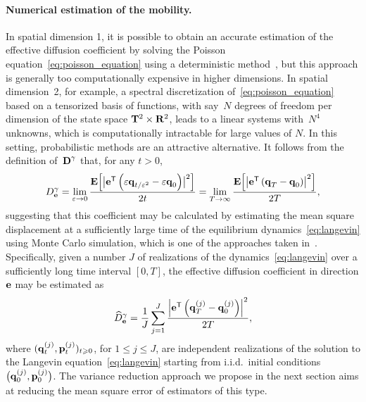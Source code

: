 \documentclass[11pt,a4paper]{article}
\begin{document}
\paragraph{Numerical estimation of the mobility.}
In spatial dimension 1,
it is possible to obtain an accurate estimation of the effective diffusion coefficient by solving the Poisson equation~\eqref{eq:poisson_equation} using a deterministic method~\cite{roussel2018spectral},
but this approach is generally too computationally expensive in higher dimensions.
In spatial dimension~2, for example,
a spectral discretization of~\eqref{eq:poisson_equation} based on a tensorized basis of functions,
with say~$N$ degrees of freedom per dimension of the state space $\mathbf T^2 \times \mathbf R^2$, leads to a linear systems with~$N^4$ unknowns,
which is computationally intractable for large values of $N$.
In this setting, probabilistic methods are an attractive alternative.
It follows from the definition of~$\boldsymbol{\mathbf D}^{\gamma}$ that,
for any $t > 0$,%
\begin{equation}
    \label{eq:einsteins_formula}
    D^{\gamma}_{\boldsymbol{\mathbf e}}
    =\lim_{\varepsilon \to 0} \frac{\mathbf{E}\Bigl[\bigl\lvert \boldsymbol{\mathbf e}^\mathsf T \left(\varepsilon \boldsymbol{\mathbf q}_{t/\varepsilon^2} - \varepsilon \boldsymbol{\mathbf q}_0\right) \bigr\rvert^2\Bigr]}{2 t}
    =\lim_{T \to \infty} \frac{\mathbf{E} \Bigl[\bigl\lvert \boldsymbol{\mathbf e}^\mathsf T \left(\boldsymbol{\mathbf q}_T - \boldsymbol{\mathbf q}_0\right) \bigr\rvert^2\Bigr]}{2T},
\end{equation}
suggesting that this coefficient may be calculated by
estimating the mean square displacement at a sufficiently large time of the equilibrium dynamics~\eqref{eq:langevin}
using Monte Carlo simulation,
which is one of the approaches taken in~\cite{MR2427108}.
Specifically, given a number $J$ of realizations of the dynamics~\eqref{eq:langevin} over a sufficiently long time interval $[0, T]$,
the effective diffusion coefficient in direction $\boldsymbol{\mathbf e}$ may be estimated as
\begin{equation}
    \label{eq:naive_estimator}
    \widehat D^{\gamma}_{\boldsymbol{\mathbf e}}
    = \frac{1}{J} \sum_{j=1}^{J} \frac{\left\lvert \boldsymbol{\mathbf e}^\mathsf T \left(\boldsymbol{\mathbf q}^{(j)}_T - \boldsymbol{\mathbf q}^{(j)}_0\right) \right\rvert^2}{2T},
\end{equation}
where $(\boldsymbol{\mathbf q}_t^{(j)}, \boldsymbol{\mathbf p}_t^{(j)})_{t \geqslant 0}$, for $1 \leq j \leq J$,
are independent realizations of the solution to the Langevin equation~\eqref{eq:langevin} starting from i.i.d.\ initial conditions $\bigl(\boldsymbol{\mathbf q}^{(j)}_0, \boldsymbol{\mathbf p}^{(j)}_0\bigr)$.
The variance reduction approach we propose in the next section aims at reducing the mean square error of estimators of this type.
\end{document}

